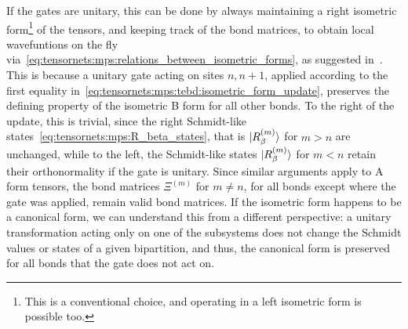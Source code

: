 %
If the gates are unitary, this can be done by always maintaining a right isometric form\footnote{
    This is a conventional choice, and operating in a left isometric form is possible too.
} of the tensors, and keeping track of the bond matrices, to obtain local wavefuntions on the fly via~\eqref{eq:tensornets:mps:relations_between_isometric_forms}, as suggested in~\cite{vidal2007}.
%
This is because a unitary gate acting on sites $n, n+1$, applied according to the first equality in~\eqref{eq:tensornets:mps:tebd:isometric_form_update}, preserves the defining property of the isometric B form for all other bonds.
%
To the right of the update, this is trivial, since the right Schmidt-like states~\eqref{eq:tensornets:mps:R_beta_states}, that is $\ket{R^{(m)}_\beta}$ for $m > n$ are unchanged, while to the left, the Schmidt-like states $\ket{R^{(m)}_\beta}$ for $m < n$ retain their orthonormality if the gate is unitary.
%
Since similar arguments apply to A form tensors, the bond matrices $\Xi^{(m)}$ for $m \neq n$, for all bonds except where the gate was applied, remain valid bond matrices.
%
If the isometric form happens to be a canonical form, we can understand this from a different perspective:
%
a unitary transformation acting only on one of the subsystems does not change the Schmidt values or states of a given bipartition, and thus, the canonical form is preserved for all bonds that the gate does not act on.

